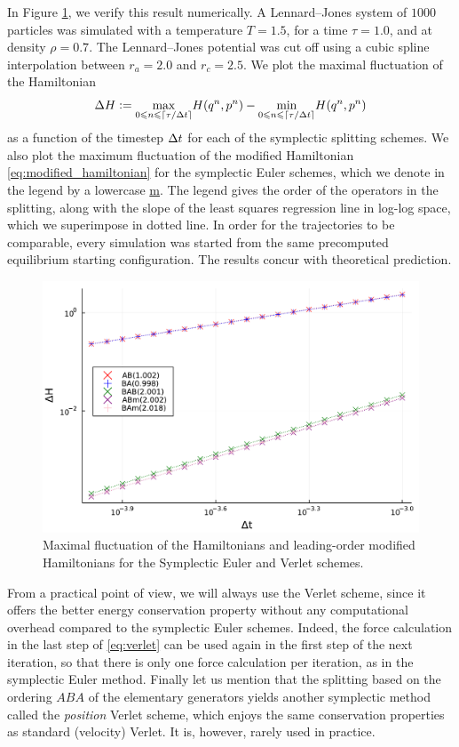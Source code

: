     In Figure \ref{fig:hamiltonian_conservation}, we verify this result numerically. 
    A Lennard--Jones system of $1000$ particles was simulated with a temperature $T=1.5$, for a time $\tau=1.0$, and at density $\rho=0.7$.
    The Lennard--Jones potential was cut off using a cubic spline interpolation between $r_a=2.0$ and $r_c=2.5$. 
    We plot the maximal fluctuation of the Hamiltonian
    \[\Delta H \mathrel{\mathop:}= \underset{0 \leqslant n \leqslant \lceil \tau/{\Delta t}\rceil}{\max} H(q^n,p^n)-\underset{0 \leqslant n \leqslant \lceil \tau/{\Delta t}\rceil}{\min} H(q^n,p^n)\]
    as a function of the timestep ${\Delta t}$ for each of the symplectic splitting schemes. We also plot the maximum fluctuation of the modified Hamiltonian \eqref{eq:modified_hamiltonian} for the symplectic Euler schemes, which we denote in the legend by a lowercase \underline{m}.
    The legend gives the order of the operators in the splitting, along with the slope of the least squares regression line in log-log space, which we superimpose in dotted line.
    In order for the trajectories to be comparable, every simulation was started from the same precomputed equilibrium starting configuration. The results concur with theoretical prediction.
    
    \begin{figure}[htbp]
        \begin{center}
          \includegraphics[width=0.85\linewidth]{figures/chapter1/energy_conservation.pdf}
          \caption{ \label{fig:hamiltonian_conservation}
            Maximal fluctuation of the Hamiltonians and leading-order modified Hamiltonians for the Symplectic Euler and Verlet schemes.
          }
        \end{center}
      \end{figure}

    From a practical point of view, we will always use the Verlet scheme, 
    since it offers the better energy conservation property without any computational overhead compared to the symplectic Euler schemes. 
    Indeed, the force calculation in the last step of \eqref{eq:verlet} can be used again in the first step of the next iteration, so that there is only one force calculation per iteration, as in the symplectic Euler method.
    Finally let us mention that the splitting based on the ordering $ABA$ of the elementary generators yields another symplectic method called the \textit{position} Verlet scheme, which enjoys the same conservation properties as standard (velocity) Verlet.
    It is, however, rarely used in practice.

